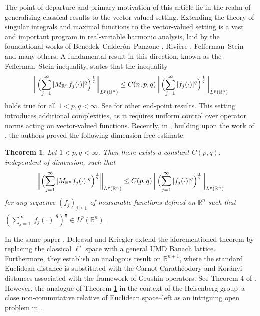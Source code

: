 \documentclass[11pt]{amsart}
\newtheorem{theorem}{Theorem}[section]
\theoremstyle{definition}
\numberwithin{equation}{section}
\begin{document}
The point of departure and primary motivation  of this article lie in the realm of generalising classical results to the vector-valued setting. Extending the theory of singular integrals and maximal functions to the vector-valued setting is a vast and important program in real-variable harmonic analysis, laid by the foundational works of Benedek--Calder\'on--Panzone \cite{BCP}, Rivière \cite{Riviere}, Fefferman--Stein \cite{FS} and many others. A fundamental result in this direction, known as the Fefferman--Stein inequality, states that the inequality
\[
\biggl\|\Bigl(\sum_{j=1}^{\infty}|M_{\mathbb{R}^n}f_j(\cdot)|^q\Bigr)^\frac{1}{q}\biggr\|_{L^p(\mathbb R^n)}\leq C(n, p, q)\, \biggl\|\Bigl(\sum_{j=1}^{\infty}|f_j(\cdot)|^q\Bigr)^\frac{1}{q}\biggr\|_{L^p(\mathbb R^n)}
\]
 holds true for all $1<p, q<\infty.$ 
See \cite{FS} for other end-point results. This setting introduces additional complexities, as it requires uniform control over operator norms acting on vector-valued functions. Recently, in \cite{DK}, building upon the work of \cite{SS}, the authors proved the following dimension-free estimate:
\begin{theorem}
    \label{DK-dimfree-Rn}
    Let $1<p, q<\infty.$ Then there exists a constant $C(p, q),$ independent of dimension, such that 
\[
\biggl\|\Bigl(\sum_{j=1}^{\infty}|M_{\mathbb{R}^n}f_j(\cdot)|^q\Bigr)^\frac{1}{q}\biggr\|_{L^p(\mathbb R^n)}\leq C(p, q)\, \biggl\|\Bigl(\sum_{j=1}^{\infty}|f_j(\cdot)|^q\Bigr)^\frac{1}{q}\biggr\|_{L^p(\mathbb R^n)}
\]
for any  sequence $(f_j)_{j\geq 1}$  of measurable functions defined on $\mathbb{R}^n$ such that $\left(\sum_{j=1}^\infty|f_j(\cdot)|^q\right)^{\frac1q}\in L^p(\mathbb{R}^n).$
\end{theorem}
In the same paper \cite{DK}, Deleaval and Kriegler extend the aforementioned theorem by replacing the classical $\ell^q$ space with a general UMD Banach lattice. Furthermore, they establish an analogous result on $\mathbb{R}^{n+1}$, where the standard Euclidean distance is substituted with the Carnot-Carathéodory and Kor\'anyi distances associated with the framework of Grushin operators. See Theorem 4 of \cite{DK}. However, the analogue of Theorem \ref{DK-dimfree-Rn} in the context of the Heisenberg group--a close non-commutative relative of Euclidean space--left as an intriguing open problem in \cite{DK}.
\end{document}
